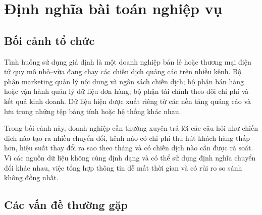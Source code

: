 \section{Định nghĩa bài toán nghiệp vụ}
\subsection{Bối cảnh tổ chức}

Tình huống sử dụng giả định là một doanh nghiệp bán lẻ hoặc thương mại điện tử quy mô nhỏ–vừa đang chạy các chiến dịch quảng cáo trên nhiều kênh. Bộ phận marketing quản lý nội dung và ngân sách chiến dịch; bộ phận bán hàng hoặc vận hành quản lý dữ liệu đơn hàng; bộ phận tài chính theo dõi chi phí và kết quả kinh doanh. Dữ liệu hiện được xuất riêng từ các nền tảng quảng cáo và lưu trong những tệp bảng tính hoặc hệ thống khác nhau.\medskip

Trong bối cảnh này, doanh nghiệp cần thường xuyên trả lời các câu hỏi như chiến dịch nào tạo ra nhiều chuyển đổi, kênh nào có chi phí thu hút khách hàng thấp hơn, hiệu suất thay đổi ra sao theo tháng và có chiến dịch nào cần được rà soát. Vì các nguồn dữ liệu không cùng định dạng và có thể sử dụng định nghĩa chuyển
đổi khác nhau, việc tổng hợp thông tin dễ mất thời gian và có rủi ro so sánh không đồng nhất.

\subsection{Các vấn đề thường gặp}

